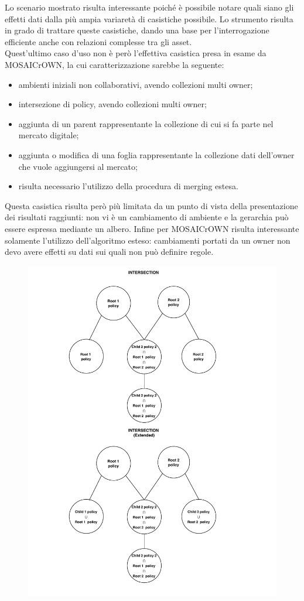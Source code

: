 \documentclass[12pt,a4paper,twoside]{book}
\begin{document}
Lo scenario mostrato risulta interessante poiché è possibile notare quali siano gli effetti dati dalla più ampia variaretà di casistiche possibile. Lo strumento risulta in grado di trattare queste casistiche, dando una base per l'interrogazione efficiente anche con relazioni complesse tra gli asset. \\
Quest'ultimo caso d'uso non è però l'effettiva casistica presa in esame da MOSAICrOWN, la cui caratterizzazione sarebbe la seguente:
\begin{itemize}
\item ambienti iniziali non collaborativi, avendo collezioni multi owner;
\item intersezione di policy, avendo collezioni multi owner;
\item aggiunta di un parent rappresentante la collezione di cui si fa parte nel mercato digitale;
\item aggiunta o modifica di una foglia rappresentante la collezione dati dell'owner che vuole aggiungersi al mercato;
\item risulta necessario l'utilizzo della procedura di merging estesa.
\end{itemize}
Questa casistica risulta però più limitata da un punto di vista della presentazione dei risultati raggiunti: non vi è un cambiamento di ambiente e la gerarchia può essere espressa mediante un albero. Infine per MOSAICrOWN risulta interessante solamente l'utilizzo dell'algoritmo esteso: cambiamenti portati da un owner non devo avere effetti su dati sui quali non può definire regole.
\begin{figure}[H]
\centering
\includegraphics[scale=.80]{../immagini/DAGExampleRES.pdf}
\caption{}
\label{DAGResult}
\end{figure}
\end{document}
